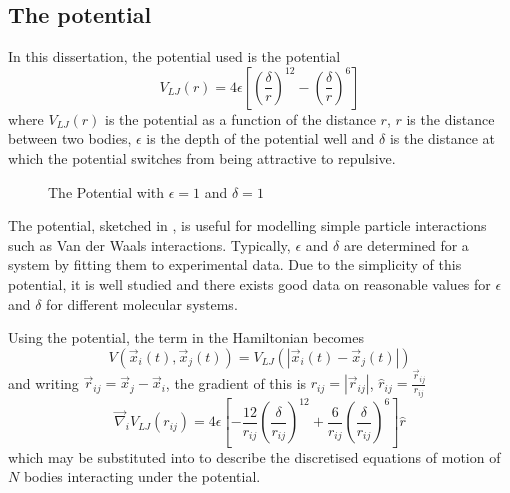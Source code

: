 \subsection{The \LennardJones{} potential}
%
In this dissertation, the \twobody{} potential used is
the \LennardJones{} potential
\begin{equation}
    \label{eqn:the_lennard_jones_potential}
    V_{LJ}(r) = 4\epsilon \left[
        \left( \frac{\delta}{r} \right)^{12}
        - \left( \frac{\delta}{r} \right)^{6}
    \right]
\end  {equation}
where $V_{LJ}(r)$ is the \LennardJones{} potential as
a function of the distance $r$,
$r$ is the distance between two bodies,
$\epsilon$ is the depth of the potential well and
$\delta$ is the distance at which
the potential switches from being attractive to repulsive.

\begin{figure}
    
    \caption{The \LennardJones{} Potential with $\epsilon = 1$ and $\delta = 1$}
    \label{fig:lennard_jones_potential}
\end  {figure}

%
The \LennardJones{} potential, sketched in
,
is useful for modelling simple particle interactions such as
Van der Waals interactions.
%
Typically, $\epsilon$ and $\delta$ are determined for a system by
fitting them to experimental data.
%
Due to the simplicity of this potential,
it is well studied and there exists good data on
reasonable values for $\epsilon$ and $\delta$ for
different molecular systems.

%
Using the \LennardJones{} potential, the \twobody{} term in the Hamiltonian
becomes
\begin{equation}
    V(\vec{x}_i(t), \vec{x}_j(t)) = V_{LJ}(|\vec{x}_i(t) - \vec{x}_j(t)|)
\end  {equation}
and writing $\vec{r}_{ij} = \vec{x}_j - \vec{x}_i$, the gradient of this is
$r_{ij} = |\vec{r}_{ij}|$, $\hat{r}_{ij} = \frac{\vec{r}_{ij}}{r_{ij}}$
\begin{equation}
    \vec{\nabla}_i V_{LJ}(r_{ij}) = 4\epsilon \left[
        - \frac{12}{r_{ij}} \left( \frac{\delta}{r_{ij}} \right)^{12}
        + \frac{6}{r_{ij}} \left( \frac{\delta}{r_{ij}} \right)^{6}
    \right] \hat{r}
\end  {equation}
which may be substituted into  to describe
the discretised equations of motion of $N$ bodies interacting under the
\LennardJones{} potential.


